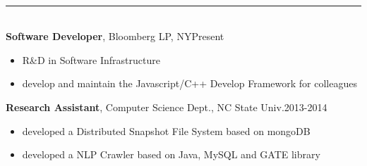 \documentclass[10pt,oneside,letter,final]{article}
\newenvironment{CVsection}[1]{
    \hspace*{20pt}{\bf \Large #1}\\[-3pt]
    \rule[5pt]{\textwidth}{1pt}\\
}{
    \hspace{-10pt}\hfill\\[10pt]
}
\newenvironment{CVexperience}[3]{
    {\bf #1}, #2\hfill #3\\[2pt]
    \begin{itemize}
        \setlength{\parsep}{0pt}
        \setlength{\itemsep}{0pt}\vspace{-16pt}
}{
    \end{itemize}
}
\begin{document}
     \begin{CVsection}{\Large W\large ORKING \Large E\large XPERIENCE}
		\begin{CVexperience}{Software Developer}{Bloomberg LP, NY}{Present}
			\item R\&D in Software Infrastructure
			\item develop and maintain the Javascript/C++ Develop Framework for colleagues
		\end{CVexperience}
        \begin{CVexperience}{Research Assistant}{Computer Science Dept., NC State Univ.}{2013-2014}
            \item developed a Distributed Snapshot File System based on mongoDB 
            \item developed a NLP Crawler based on Java, MySQL and GATE library
        \end{CVexperience}

    \end{CVsection}
    \\[-20pt]
\end{document}
